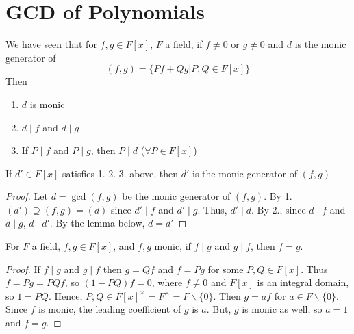 \documentclass[12pt, a4paper, oneside, openright, titlepage]{book}
\begin{document}
\section{\textsection GCD of Polynomials}

\begin{defn}[GCD]
        We have seen that for $f,g \in F[x]$, $F$ a field, if $f \neq 0$ or $g \neq 0$ and $d$ is the monic generator of \begin{equation}
                (f,g) = \{Pf+Qg\vert P,Q\in F[x]\}
        \end{equation}
        Then \begin{enumerate}
                \item $d$ is monic
                \item $d\;\vert\;f$ and $d\;\vert\;g$
                \item If $P\;\vert\;f$ and $P\;\vert\;g$, then $P\;\vert\;d$ ($\forall P \in F[x]$)
        \end{enumerate}
\end{defn}

\begin{rmk}
        If $d' \in F[x]$ satisfies 1.-2.-3. above, then $d'$ is the monic generator of $(f,g)$
\end{rmk}
\begin{proof}
        Let $d = \gcd(f,g)$ be the monic generator of $(f,g)$. By 1. $(d') \supseteq (f,g) = (d)$ since $d'\;\vert\;f$ and $d'\;\vert\;g$. Thus, $d'\;\vert\;d$. By 2., since $d\;\vert\;f$ and $d\;\vert\;g$, $d\;\vert\;d'$. By the lemma below, $d = d'$
\end{proof}

\begin{lem}
        For $F$ a field, $f,g \in F[x]$, and $f,g$ monic, if $f\;\vert\;g$ and $g\;\vert\;f$, then $f = g$.
\end{lem}
\begin{proof}
        If $f\;\vert\;g$ and $g\;\vert\;f$ then $g = Qf$ and $f = Pg$ for some $P,Q \in F[x]$. Thus $f = Pg = PQf$, so $(1-PQ)f = 0$, where $f \neq 0$ and $F[x]$ is an integral domain, so $1 = PQ$. Hence, $P,Q \in F[x]^{\times} = F^{\times} = F\backslash\{0\}$. Then $g = af$ for $a \in F\backslash\{0\}$. Since $f$ is monic, the leading coefficient of $g$ is $a$. But, $g$ is monic as well, so $a = 1$ and $f = g$.
\end{proof}
\end{document}
